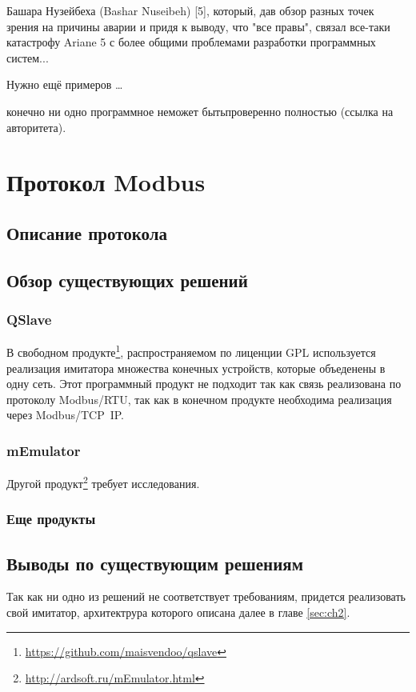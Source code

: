 Башара Нузейбеха (Bashar Nuseibeh) [5], который, дав обзор разных точек зрения на причины аварии и придя к выводу, что "все правы", связал все-таки катастрофу Ariane 5 с более общими проблемами разработки программных систем...

Нужно ещё примеров \ldots

конечно ни одно программное неможет бытьпроверенно полностью (ссылка на авторитета).

\chapter{Протокол Modbus}\label{ch:ch1}

\section{Описание протокола}

\section{Обзор существующих решений}\label{sec:ch1/sec1}
\subsection{QSlave}

В свободном продукте\footnote{\url{https://github.com/maisvendoo/qslave}}, распространяемом по лиценции GPL используется
реализация имитатора множества конечных устройств, которые объеденены в одну сеть.
Этот программный продукт не подходит так как связь реализована по протоколу
Modbus/RTU, так как в конечном продукте необходима реализация через Modbus/TCP~IP.

\subsection{mEmulator}
Другой продукт\footnote{\url{http://ardsoft.ru/mEmulator.html}} требует исследования.


\subsection{Еще продукты}


\section{Выводы по существующим решениям}

Так как ни одно из решений не соответствует требованиям, придется реализовать свой
имитатор, архитектрура которого описана далее в главе \ref{sec:ch2}.